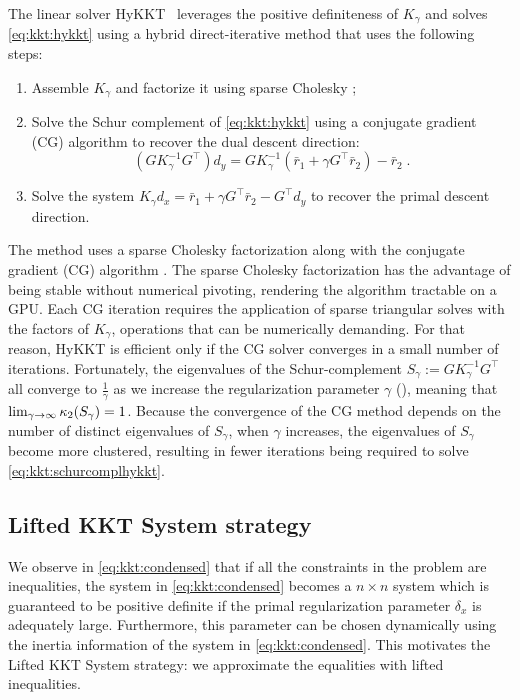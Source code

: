The linear solver HyKKT~\cite{regev2023hykkt}
leverages the positive definiteness of $K_\gamma$ and solves
\eqref{eq:kkt:hykkt} using a hybrid direct-iterative method
that uses the following steps:
\begin{enumerate}
  \item Assemble $K_\gamma$ and factorize it using sparse Cholesky ;
  \item Solve the Schur complement of \eqref{eq:kkt:hykkt} using a conjugate gradient (CG)
    algorithm to recover the dual descent direction:
    \begin{equation}
      \label{eq:kkt:schurcomplhykkt}
      (G K_\gamma^{-1} G^\top) d_y = G K_\gamma^{-1} (\bar{r}_1 + \gamma G^\top \bar{r}_2) - \bar{r}_2 \; .
    \end{equation}
  \item Solve the system $K_\gamma d_x = \bar{r}_1 + \gamma G^\top \bar{r}_2 - G^\top d_y$
    to recover the primal descent direction.
\end{enumerate}
The method uses a sparse Cholesky factorization along with the conjugate gradient (CG) algorithm \cite{hestenes-stiefel-1952}.
The sparse Cholesky factorization has the advantage of being stable without
numerical pivoting, rendering the algorithm tractable on a GPU.
Each CG iteration requires the application of sparse triangular solves with the
factors of $K_\gamma$, operations that can be numerically demanding. For that reason,
HyKKT is efficient only if the CG solver converges in a small number of iterations.
Fortunately, the eigenvalues of the Schur-complement $S_\gamma := G K_\gamma^{-1} G^\top$
all converge to $\frac{1}{\gamma}$ as we increase the regularization parameter
$\gamma$ (\cite[Theorem 4]{regev2023hykkt}), meaning that $\lim_{\gamma \to \infty} \kappa_2(S_\gamma) = 1$.
Because the convergence of the CG method depends on the number of distinct eigenvalues of $S_{\gamma}$, when $\gamma$ increases, the eigenvalues of $S_{\gamma}$ become more clustered, resulting in fewer iterations being required to solve \eqref{eq:kkt:schurcomplhykkt}.

\subsection{Lifted KKT System strategy}
\label{sec:kkt:sckkt}

We observe in \eqref{eq:kkt:condensed} that if all the constraints in the problem are inequalities, the system in \eqref{eq:kkt:condensed} becomes a $n \times n$ system which is guaranteed to be positive definite if the primal regularization parameter $\delta_x$ is adequately large. Furthermore, this parameter can be chosen dynamically using the inertia information of the system in \eqref{eq:kkt:condensed}. This motivates the Lifted KKT System strategy: we approximate the equalities with lifted inequalities.

